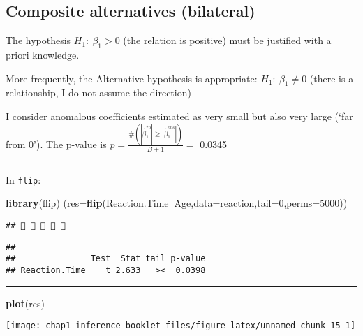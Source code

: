 \documentclass[]{article}
\newenvironment{Shaded}{\begin{snugshade}}{\end{snugshade}}
\newcommand{\KeywordTok}[1]{\textcolor[rgb]{0.13,0.29,0.53}{\textbf{#1}}}
\newcommand{\DataTypeTok}[1]{\textcolor[rgb]{0.13,0.29,0.53}{#1}}
\newcommand{\DecValTok}[1]{\textcolor[rgb]{0.00,0.00,0.81}{#1}}
\newcommand{\OperatorTok}[1]{\textcolor[rgb]{0.81,0.36,0.00}{\textbf{#1}}}
\newcommand{\NormalTok}[1]{#1}
\begin{document}
\subsection{Composite alternatives
(bilateral)}\label{composite-alternatives-bilateral}

The hypothesis \(H_1: \ \beta_1 >0\) (the relation is positive) must be
justified with a priori knowledge.

More frequently, the Alternative hypothesis is appropriate:
\(H_1: \ \beta_1 \neq 0\) (there is a relationship, I do not assume the
direction)

I consider anomalous coefficients estimated as very small but also very
large (`far from 0'). The p-value is
\(p=\frac{\#(|\hat{\beta}_1^{*b} | \geq|\hat{\beta}_1^{obs}|)}{B+1}=\)
0.0345

\begin{center}\rule{0.5\linewidth}{\linethickness}\end{center}

In \texttt{flip}:

\begin{Shaded}
\begin{Highlighting}[]
\KeywordTok{library}\NormalTok{(flip)}
\NormalTok{(}\DataTypeTok{res=}\KeywordTok{flip}\NormalTok{(Reaction.Time}\OperatorTok{~}\NormalTok{Age,}\DataTypeTok{data=}\NormalTok{reaction,}\DataTypeTok{tail=}\DecValTok{0}\NormalTok{,}\DataTypeTok{perms=}\DecValTok{5000}\NormalTok{))}
\end{Highlighting}
\end{Shaded}

\begin{verbatim}
##     
\end{verbatim}

\begin{verbatim}
## 
##               Test  Stat tail p-value
## Reaction.Time    t 2.633   ><  0.0398
\end{verbatim}

\begin{center}\rule{0.5\linewidth}{\linethickness}\end{center}

\begin{Shaded}
\begin{Highlighting}[]
\KeywordTok{plot}\NormalTok{(res)}
\end{Highlighting}
\end{Shaded}

\begin{center}\texttt{[image: chap1\_inference\_booklet\_files/figure-latex/unnamed-chunk-15-1]} \end{center}
\end{document}
